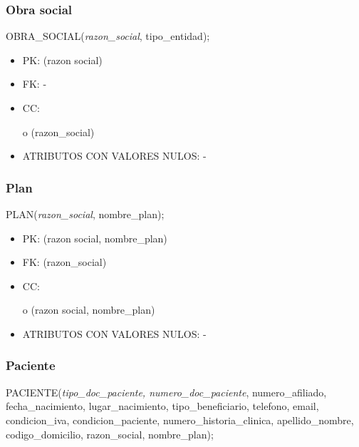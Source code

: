 \documentclass[a4paper,11pt]{article}
\begin{document}
\subsubsection{\textbf{Obra social}}

OBRA\_SOCIAL(\emph{razon\_social}, tipo\_entidad);

\begin{itemize}
\item PK: (razon social)

\item FK: -

\item CC:

o (razon\_social)

\item ATRIBUTOS CON VALORES NULOS: -\label{HToc293405834}
\end{itemize}

\subsubsection{\textbf{Plan}}

PLAN(\emph{razon\_social}, nombre\_plan);

\begin{itemize}
\item PK: (razon social, nombre\_plan)

\item FK: (razon\_social)

\item CC:

o (razon social, nombre\_plan)

\item ATRIBUTOS CON VALORES NULOS: -\label{HToc293405835}
\end{itemize}

\subsubsection{\textbf{Paciente}}

PACIENTE(\emph{tipo\_doc\_paciente, numero\_doc\_paciente}, numero\_afiliado, fecha\_nacimiento, 
lugar\_nacimiento, tipo\_beneficiario, telefono, email, condicion\_iva, condicion\_paciente, 
numero\_historia\_clinica, apellido\_nombre, codigo\_domicilio, razon\_social, 
 nombre\_plan);
\end{document}
